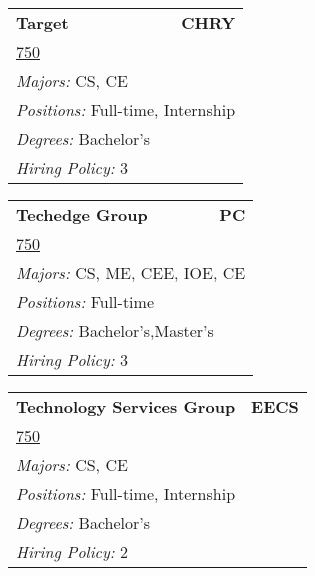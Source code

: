 \documentclass[twoside]{article}
\begin{document}
\begin{center}
\begin{multicols}{3}
\begin{FlushLeft}
\begin{minipage}{\columnwidth}
\end{minipage}
 
\begin{minipage}{\columnwidth}\begin{tabularx}{.95\columnwidth}{Xr}
                 {\Large\bf Target} & {\Large\bf CHRY}\\
    \multicolumn{2}{p{.95\columnwidth}}{\url{750}}\\
    \multicolumn{2}{p{.95\columnwidth}}{\emph{Majors:} CS, CE}\\
    \multicolumn{2}{p{.95\columnwidth}}{\emph{Positions:} Full-time, Internship}\\
    \multicolumn{2}{p{.95\columnwidth}}{\emph{Degrees:} Bachelor's}\\
    \multicolumn{2}{p{.95\columnwidth}}{\emph{Hiring Policy:} 3}\\
    \end{tabularx}
    
\end{minipage}
 
\begin{minipage}{\columnwidth}\begin{tabularx}{.95\columnwidth}{Xr}
                 {\Large\bf Techedge Group} & {\Large\bf PC}\\
    \multicolumn{2}{p{.95\columnwidth}}{\url{750}}\\
    \multicolumn{2}{p{.95\columnwidth}}{\emph{Majors:} CS, ME, CEE, IOE, CE}\\
    \multicolumn{2}{p{.95\columnwidth}}{\emph{Positions:} Full-time}\\
    \multicolumn{2}{p{.95\columnwidth}}{\emph{Degrees:} Bachelor's,Master's}\\
    \multicolumn{2}{p{.95\columnwidth}}{\emph{Hiring Policy:} 3}\\
    \end{tabularx}
    
\end{minipage}
 
\begin{minipage}{\columnwidth}\begin{tabularx}{.95\columnwidth}{Xr}
                 {\Large\bf Technology Services Group} & {\Large\bf EECS}\\
    \multicolumn{2}{p{.95\columnwidth}}{\url{750}}\\
    \multicolumn{2}{p{.95\columnwidth}}{\emph{Majors:} CS, CE}\\
    \multicolumn{2}{p{.95\columnwidth}}{\emph{Positions:} Full-time, Internship}\\
    \multicolumn{2}{p{.95\columnwidth}}{\emph{Degrees:} Bachelor's}\\
    \multicolumn{2}{p{.95\columnwidth}}{\emph{Hiring Policy:} 2}\\
    \end{tabularx}
    

\end{minipage}
\end{FlushLeft}
\end{multicols}
\end{center}
\end{document}
